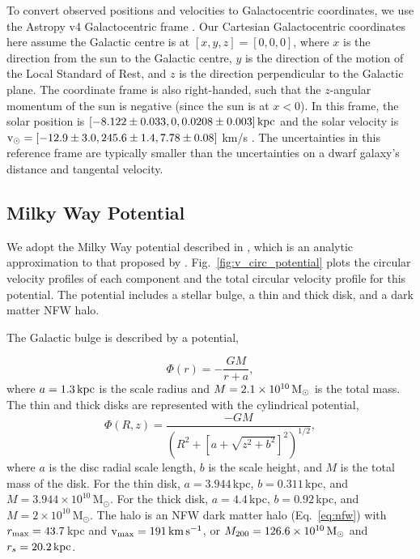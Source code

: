 To convert observed positions and velocities to Galactocentric
coordinates, we use the Astropy v4 Galactocentric frame
\citep{astropycollaboration+2022}. Our Cartesian Galactocentric
coordinates here assume the Galactic centre is at
\([x, y, z] = [0,0,0]\), where \(x\) is the direction from the sun to
the Galactic centre, \(y\) is the direction of the motion of the Local
Standard of Rest, and \(z\) is the direction perpendicular to the
Galactic plane. The coordinate frame is also right-handed, such that the
\(z\)-angular momentum of the sun is negative (since the sun is at
\(x<0\)). In this frame, the solar position is
\([-8.122 \pm 0.033, 0, 0.0208 \pm 0.003]\, {\rm kpc}\)
\citep{gravitycollaboration+2018, bennett+bovy2019} and the solar
velocity is \({\rm v}_\odot = [-12.9 \pm 3.0, 245.6 \pm 1.4, 7.78 \pm 0.08]\)
km/s
\citep{reid+brunthaler2004, drimmel+poggio2018, gravitycollaboration+2018}.
The uncertainties in this reference frame are typically smaller than the
uncertainties on a dwarf galaxy's distance and tangental velocity.

\subsection{Milky Way Potential}\label{milky-way-potential}

We adopt the Milky Way potential described in \citet{EP2020}, which is
an analytic approximation to that proposed by \citet{mcmillan2011}.
Fig.~\ref{fig:v_circ_potential} plots the circular velocity profiles of
each component and the total circular velocity profile for this
potential. The potential includes a stellar bulge, a thin and thick
disk, and a dark matter NFW halo.

The Galactic bulge is described by a \citet{hernquist1990} potential,

\begin{equation}{
\Phi(r) = - \frac{GM}{r + a},
}\end{equation} where \(a=1.3\,{\rm kpc}\) is the scale radius and
\(M=2.1 \times 10^{10}\,{\rm M}_{\odot}\) is the total mass. The thin and thick
disks are represented with the \citet{miyamoto+nagai1975} cylindrical
potential, \begin{equation}{
\Phi(R, z) = \frac{-GM}{\left(R^2 + \left[a + \sqrt{z^2 + b^2}\right]^{2}\right)^{1/2}},
}\end{equation} where \(a\) is the disc radial scale length, \(b\) is
the scale height, and \(M\) is the total mass of the disk. For the thin
disk, \(a=3.944\,\)kpc, \(b=0.311\,\)kpc, and
\(M=3.944\times10^{10}\,\)M\(_\odot\). For the thick disk,
\(a=4.4\,\)kpc, \(b=0.92\,\)kpc, and \(M=2\times10^{10}\,\)M\(_\odot\).
The halo is an NFW dark matter halo (Eq.~\ref{eq:nfw}) with
\(r_{\rm max} = 43.7\,\)kpc and \({\rm v}_{\rm max} = 191\,{\rm km\,s^{-1}}\), or
\(M_{200} = 126.6\times 10^{10}\,{\rm M}_{\odot}\) and \(r_s=20.2\,{\rm kpc}\).

